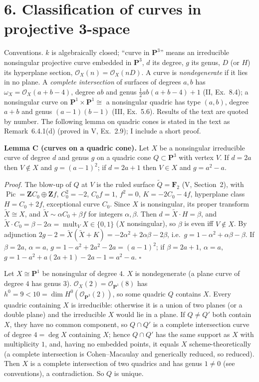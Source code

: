 \documentclass[11pt]{article}
\begin{document}
\section*{6. Classification of curves in projective 3-space}

Conventions. $k$ is algebraically closed; ``curve in $\mathbf P^3$'' means an irreducible nonsingular projective curve embedded in $\mathbf P^3$, $d$ its degree, $g$ its genus, $D$ (or $H$) its hyperplane section, $\mathcal O_X(n)=\mathcal O_X(nD)$. A curve is \emph{nondegenerate} if it lies in no plane. A \emph{complete intersection} of surfaces of degrees $a,b$ has $\omega_X=\mathcal O_X(a+b-4)$, degree $ab$ and genus $\frac12ab(a+b-4)+1$ (II, Ex.~8.4); a nonsingular curve on $\mathbf P^1\times\mathbf P^1\cong$ a nonsingular quadric has type $(a,b)$, degree $a+b$ and genus $(a-1)(b-1)$ (III, Ex.~5.6). Results of the text are quoted by number. The following lemma on quadric cones is stated in the text as Remark~6.4.1(d) (proved in V, Ex.~2.9); I include a short proof.

\medskip
\noindent\textbf{Lemma C (curves on a quadric cone).} Let $X$ be a nonsingular irreducible curve of degree $d$ and genus $g$ on a quadric cone $Q\subset\mathbf P^3$ with vertex $V$. If $d=2a$ then $V\notin X$ and $g=(a-1)^2$; if $d=2a+1$ then $V\in X$ and $g=a^2-a$.

\emph{Proof.} The blow-up of $Q$ at $V$ is the ruled surface $\tilde Q=\mathbf F_2$ (V, Section~2), with $\operatorname{Pic}=\mathbf ZC_0\oplus\mathbf Zf$, $C_0^2=-2$, $C_0f=1$, $f^2=0$, $K=-2C_0-4f$, hyperplane class $H=C_0+2f$, exceptional curve $C_0$. Since $X$ is nonsingular, its proper transform $\tilde X\cong X$, and $\tilde X\sim\alpha C_0+\beta f$ for integers $\alpha,\beta$. Then $d=\tilde X\cdot H=\beta$, and $\tilde X\cdot C_0=\beta-2\alpha=\operatorname{mult}_VX\in\{0,1\}$ ($X$ nonsingular), so $\beta$ is even iff $V\notin X$. By adjunction $2g-2=\tilde X(\tilde X+K)=-2\alpha^2+2\alpha\beta-2\beta$, i.e.\ $g=1-\alpha^2+\alpha\beta-\beta$. If $\beta=2a$, $\alpha=a$, $g=1-a^2+2a^2-2a=(a-1)^2$; if $\beta=2a+1$, $\alpha=a$, $g=1-a^2+a(2a+1)-2a-1=a^2-a$. \hfill$\square$

\pf
Let $X\cong\mathbf P^1$ be nonsingular of degree $4$. $X$ is nondegenerate (a plane curve of degree $4$ has genus $3$). $\mathcal O_X(2)=\mathcal O_{\mathbf P^1}(8)$ has $h^0=9<10=\dim H^0(\mathcal O_{\mathbf P^3}(2))$, so some quadric $Q$ contains $X$. Every quadric containing $X$ is irreducible: otherwise it is a union of two planes (or a double plane) and the irreducible $X$ would lie in a plane. If $Q\ne Q'$ both contain $X$, they have no common component, so $Q\cap Q'$ is a complete intersection curve of degree $4=\deg X$ containing $X$; hence $Q\cap Q'$ has the same support as $X$ with multiplicity $1$, and, having no embedded points, it equals $X$ scheme-theoretically (a complete intersection is Cohen--Macaulay and generically reduced, so reduced). Then $X$ is a complete intersection of two quadrics and has genus $1\ne0$ (see conventions), a contradiction. So $Q$ is unique.
\end{document}
